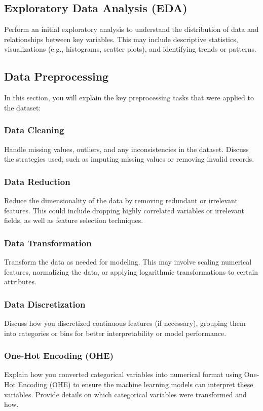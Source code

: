 \documentclass[conference]{IEEEtran}
\begin{document}
\subsection{Exploratory Data Analysis (EDA)}
\label{subsec:eda}
Perform an initial exploratory analysis to understand the distribution of data and relationships between key variables. This may include descriptive statistics, visualizations (e.g., histograms, scatter plots), and identifying trends or patterns.

\subsection{Data Preprocessing}
\label{subsec:data_preprocessing}
In this section, you will explain the key preprocessing tasks that were applied to the dataset:

\subsubsection{Data Cleaning}
Handle missing values, outliers, and any inconsistencies in the dataset. Discuss the strategies used, such as imputing missing values or removing invalid records.

\subsubsection{Data Reduction}
Reduce the dimensionality of the data by removing redundant or irrelevant features. This could include dropping highly correlated variables or irrelevant fields, as well as feature selection techniques.

\subsubsection{Data Transformation}
Transform the data as needed for modeling. This may involve scaling numerical features, normalizing the data, or applying logarithmic transformations to certain attributes.

\subsubsection{Data Discretization}
Discuss how you discretized continuous features (if necessary), grouping them into categories or bins for better interpretability or model performance.

\subsubsection{One-Hot Encoding (OHE)}
Explain how you converted categorical variables into numerical format using One-Hot Encoding (OHE) to ensure the machine learning models can interpret these variables. Provide details on which categorical variables were transformed and how.
\end{document}
